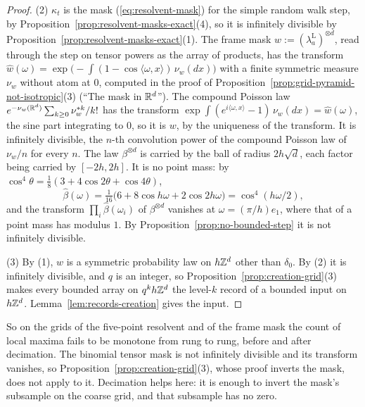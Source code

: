 \begin{proof}
(2) $\kappa_t$ is the mask (\ref{eq:resolvent-mask}) for the simple random walk step, by
Proposition~\ref{prop:resolvent-masks-exact}(4), so it is infinitely divisible by
Proposition~\ref{prop:resolvent-masks-exact}(1). The frame mask $w := (\lambda^{\mathrm L}_a)^{\otimes d}$, read through the step on tensor powers as
the array of products, has the transform
$\widehat{w}(\omega) = \exp\bigl(-\int(1 - \cos\langle\omega, x\rangle)\,\nu_w(dx)\bigr)$ with a
finite symmetric measure $\nu_w$ without atom at $0$, computed in the proof of
Proposition~\ref{prop:grid-pyramid-not-isotropic}(3) (``The mask in $\mathbb{R}^d$''). The compound
Poisson law $e^{-\nu_w(\mathbb{R}^d)}\sum_{k \ge 0}\nu_w^{*k}/k!$ has the transform
$\exp\int(e^{i\langle\omega, x\rangle} - 1)\,\nu_w(dx) = \widehat{w}(\omega)$, the sine part
integrating to $0$, so it is $w$, by the uniqueness of the transform. It is infinitely divisible,
the $n$-th convolution power of the compound Poisson law of $\nu_w/n$ for every $n$. The law
$\beta^{\otimes d}$ is carried by the ball of radius $2h\sqrt d$, each factor being carried by
$[-2h, 2h]$. It is no point mass: by
$\cos^4\theta = \tfrac18(3 + 4\cos 2\theta + \cos 4\theta)$,
\[
\widehat{\beta}(\omega) = \tfrac{1}{16}\bigl(6 + 8\cos h\omega + 2\cos 2h\omega\bigr) =
\cos^4(h\omega/2),
\]
and the transform $\prod_i\widehat{\beta}(\omega_i)$ of $\beta^{\otimes d}$ vanishes at
$\omega = (\pi/h)e_1$, where that of a point mass has modulus $1$. By
Proposition~\ref{prop:no-bounded-step} it is not infinitely divisible.

(3) By (1), $w$ is a symmetric probability law on $h\mathbb{Z}^d$ other than $\delta_0$. By (2) it is
infinitely divisible, and $q$ is an integer, so Proposition~\ref{prop:creation-grid}(3) makes every
bounded array on $q^kh\mathbb{Z}^d$ the level-$k$ record of a bounded input on $h\mathbb{Z}^d$.
Lemma~\ref{lem:records-creation} gives the input.
\end{proof}

So on the grids of the five-point resolvent and of the frame mask the count of local maxima fails
to be monotone from rung to rung, before and after decimation. The binomial tensor mask is not
infinitely divisible and its transform vanishes, so Proposition~\ref{prop:creation-grid}(3), whose
proof inverts the mask, does not apply to it. Decimation helps here: it is enough to invert the
mask's subsample on the coarse grid, and that subsample has no zero.


